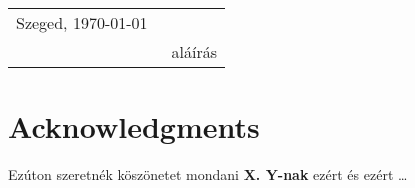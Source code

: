 \documentclass[12pt]{report}
\begin{document}
\begin{tabular}{lc}
	Szeged, \today\
	\hspace{2cm} & \makebox[6cm]{\dotfill} \\
	& aláírás \\
\end{tabular}

\chapter*{Acknowledgments}

Ezúton szeretnék köszönetet mondani \textbf{X. Y-nak} ezért és ezért \ldots

%
%
\end{document}
